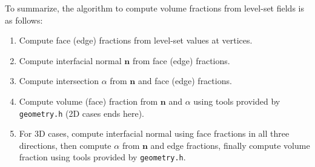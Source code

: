 To summarize, the algorithm to compute volume fractions from level-set fields is as follows:
\begin{enumerate}
  \item Compute face (edge) fractions from level-set values at vertices.
  \item Compute interfacial normal $\mathbf{n}$ from face (edge) fractions.
  \item Compute intersection $\alpha$ from $\mathbf{n}$ and face (edge) fractions.
  \item Compute volume (face) fraction from $\mathbf{n}$ and $\alpha$ using tools provided by \texttt{geometry.h} (2D cases ends here).
  \item For 3D cases, compute interfacial normal using face fractions in all three directions, then compute $\alpha$ from $\mathbf{n}$ and edge fractions, finally compute volume fraction using tools provided by \texttt{geometry.h}.
\end{enumerate}